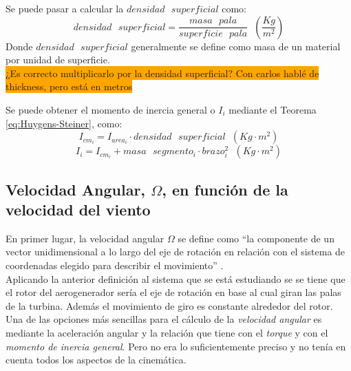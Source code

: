  
Se puede pasar a calcular la $densidad \text{ } superficial$ como:
  \begin{equation}
 densidad \text{ } superficial = \dfrac{masa \text{ } pala}{ superficie \text{ } pala} \hspace{7pt} \left(\dfrac{Kg}{m^2}\right)
 \label{def:densidad_superficial}
 \end{equation}
 Donde $ densidad \text{ } superficial $ generalmente se define como masa de un material por unidad de superficie. \\
 
 
  \colorbox{orange}{¿Es correcto multiplicarlo por la densidad superficial? Con carlos hablé de thickness, pero está en metros}
 
Se puede obtener el momento de inercia general o $I_i$ mediante el Teorema \ref{eq:Huygens-Steiner}, como:
  \begin{equation}
I_{cm_i} = I_{area_i} \cdot densidad \text{ } superficial \hspace{7pt} (Kg \cdot m^2)
 \label{def:momento_inercia_cm}
 \end{equation}
 \begin{equation}
I_i = I_{cm_i} + masa \text{ } segmento_i \cdot brazo_i^2 \hspace{7pt} (Kg \cdot m^2)
 \label{def:momento_inercia_general}
 \end{equation}

 
\subsection{Velocidad Angular, $\Omega$, en función de la velocidad del viento }

En primer lugar, la velocidad angular $\Omega$ se define como ``la componente de un vector unidimensional a lo largo del eje de rotación en relación con el sistema de coordenadas elegido para describir el movimiento'' \cite[p.~303]{cummings2004understanding}.\\

Aplicando la anterior definición al sistema que se está estudiando se se tiene que el rotor del aerogenerador sería el eje de rotación en base al cual giran las palas de la turbina. Además el movimiento de giro es constante alrededor del rotor.\\

Una de las opciones más sencillas para el cálculo de la \textit{velocidad angular} es mediante la aceleración angular y la relación que tiene con el \textit{torque} y con el \textit{momento de inercia general}. Pero no era lo suficientemente preciso y no tenía en cuenta todos los aspectos de la cinemática. \\
 
